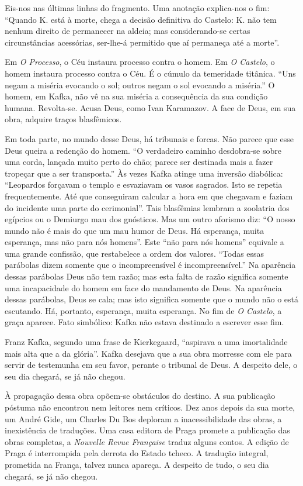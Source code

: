 Eis-nos nas últimas linhas do fragmento. Uma anotação explica-nos o fim:
``Quando K. está à morte, chega a decisão definitiva do Castelo: K. não
tem nenhum direito de permanecer na aldeia; mas considerando-se certas
circunstâncias acessórias, ser-lhe-á permitido que aí permaneça até a
morte''.

Em \textit{O Processo}, o Céu instaura processo contra o homem. Em \textit{O Castelo}, o homem instaura processo contra o Céu. É o cúmulo da
temeridade titânica. ``Uns negam a miséria evocando o sol; outros negam
o sol evocando a miséria.'' O homem, em Kafka, não vê na sua miséria a
consequência da sua condição humana. Revolta-se. Acusa Deus, como Ivan Karamazov. A face de Deus, em sua obra, adquire traços blasfêmicos.

Em toda parte, no mundo desse Deus, há tribunais e forcas. Não parece que
esse Deus queira a redenção do homem. ``O verdadeiro caminho desdobra-se
sobre uma corda, lançada muito perto do chão; parece ser destinada
mais a fazer tropeçar que a ser transposta.'' Às vezes Kafka atinge uma
inversão diabólica: ``Leopardos forçavam o templo e esvaziavam os vasos
sagrados. Isto se repetia frequentemente. Até que conseguiram calcular a
hora em que chegavam e faziam do incidente uma parte do cerimonial''.
Tais blasfêmias lembram a zoolatria dos egípcios ou o Demiurgo mau dos
gnósticos. Mas um outro aforismo diz: ``O nosso mundo não é mais do que
um mau humor de Deus. Há esperança, muita esperança, mas não para nós
homens''. Este ``não para nós homens'' equivale a uma grande confissão,
que restabelece a ordem dos valores. ``Todas essas parábolas dizem somente que o incompreensível é incompreensível.'' Na aparência dessas
parábolas Deus não tem razão; mas esta falta de razão significa somente
uma incapacidade do homem em face do mandamento de Deus. Na aparência
dessas parábolas, Deus se cala; mas isto significa somente que o mundo
não o está escutando. Há, portanto, esperança, muita esperança. No fim
de \textit{O Castelo}, a graça aparece. Fato simbólico: Kafka não estava
destinado a escrever esse fim.

Franz Kafka, segundo uma frase de
Kierkegaard, ``aspirava a uma imortalidade mais alta que a da glória''.
Kafka desejava que a sua obra morresse com ele para servir de testemunha
em seu favor, perante o tribunal de Deus. A despeito dele, o seu dia chegará, se já não chegou.

À propagação dessa obra opõem-se obstáculos do destino. A sua publicação póstuma não encontrou nem leitores nem críticos. Dez anos depois da sua morte,
um André Gide, um Charles Du Bos deploram a inacessibilidade das obras,
a inexistência de traduções. Uma casa editora de Praga promete a publicação das obras completas, a \textit{Nouvelle Revue Française} traduz alguns contos. A
edição de Praga é interrompida pela derrota do Estado tcheco. A tradução
integral, prometida na França, talvez nunca apareça. A despeito de tudo,
o seu dia chegará, se já não chegou.

